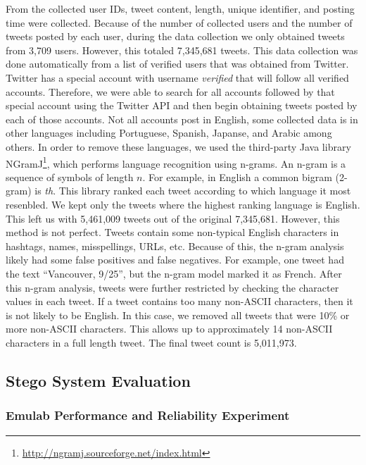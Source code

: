 From the collected user IDs, tweet content, length, unique identifier, and
posting time were collected.  Because of the number of collected users and
the number of tweets posted by each user, during the data collection we only
obtained tweets from 3,709 users.  However, this totaled 7,345,681 tweets.
This data collection was done automatically from a list of verified users that
was obtained from Twitter.  Twitter has a special account with username
\emph{verified} that will follow all verified accounts.  Therefore, we were
able to search for all accounts followed by that special account using the
Twitter API and then begin obtaining tweets posted by each of those accounts.
Not all accounts post in English, some collected data is in other languages
including Portuguese, Spanish, Japanse, and Arabic among others.  In order
to remove these languages, we used the third-party Java library
NGramJ\footnote{\url{http://ngramj.sourceforge.net/index.html}}, which performs
language recognition using n-grams.  An n-gram is a sequence of symbols of length
$n$.  For example, in English a common bigram (2-gram) is \emph{th}.  This library
ranked each tweet according to which language it most resenbled.  We kept only the
tweets where the highest ranking language is English.  This left us with 5,461,009
tweets out of the original 7,345,681.  However, this method is not perfect.
Tweets contain some non-typical English characters in hashtags, names,
misspellings, URLs, etc.  Because of this, the n-gram analysis likely had some
false positives and false negatives.  For example, one tweet had the text
``Vancouver, 9/25'', but the n-gram model marked it as French.  After this
n-gram analysis, tweets were further restricted by checking the character
values in each tweet.  If a tweet contains too many non-ASCII characters,
then it is not likely to be English.  In this case, we removed all tweets that
were 10\% or more non-ASCII characters.  This allows up to approximately 14
non-ASCII characters in a full length tweet.  The final tweet count is 5,011,973.

\subsection{Stego System Evaluation}
\label{sec:evaluation:twittercc}

\subsubsection{Emulab Performance and Reliability Experiment}
\label{subsec:evaluation:twittercc:emulab}

